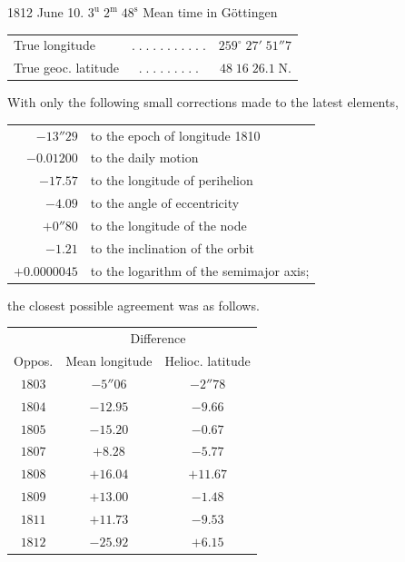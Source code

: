 1812 June 10. $3^{\mathrm u}\;2^{\mathrm m}\;48^{\mathrm s}$ Mean time in Göttingen

\begin{center}\fontsize{10}{12}\selectfont\setlength{\tabcolsep}{2pt}\renewcommand{\arraystretch}{1.15}\begin{tabular}{lcr}
True longitude & $.\;.\;.\;.\;.\;.\;.\;.\;.\;.\;.$ & $259^\circ\;27'\;51''7$\\
True geoc. latitude & $.\;.\;.\;.\;.\;.\;.\;.\;.$ & $48\;16\;26.1\;\mathrm{N}.$\\
\end{tabular}\end{center}

\par\indent With only the following small corrections made to the latest elements,

\begin{center}\fontsize{10}{12}\selectfont\setlength{\tabcolsep}{4pt}\renewcommand{\arraystretch}{1.15}\begin{tabular}{rl}
$-13''29$ & to the epoch of longitude 1810\\
$-0.01200$ & to the daily motion\\
$-17.57$ & to the longitude of perihelion\\
$-4.09$ & to the angle of eccentricity\\
$+0''80$ & to the longitude of the node\\
$-1.21$ & to the inclination of the orbit\\
$+0.0000045$ & to the logarithm of the semimajor axis;\\
\end{tabular}\end{center}

\noindent the closest possible agreement was as follows.

\begin{center}\fontsize{10}{12}\selectfont\setlength{\tabcolsep}{6pt}\renewcommand{\arraystretch}{1.15}\begin{tabular}{c|c|c}
& \multicolumn{2}{c}{Difference}\\
Oppos. & Mean longitude & Helioc. latitude\\\hline
$1803$ & $-5''06$ & $-2''78$\\
$1804$ & $-12.95$ & $-9.66$\\
$1805$ & $-15.20$ & $-0.67$\\
$1807$ & $+8.28$ & $-5.77$\\
$1808$ & $+16.04$ & $+11.67$\\
$1809$ & $+13.00$ & $-1.48$\\
$1811$ & $+11.73$ & $-9.53$\\
$1812$ & $-25.92$ & $+6.15$\\
\end{tabular}\end{center}

